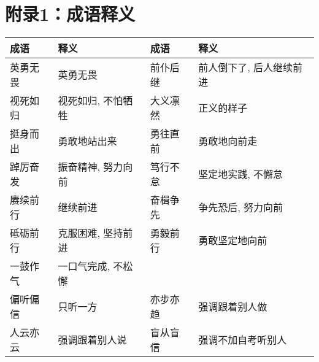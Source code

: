 \section{附录1：成语释义}


\begin{longtable}{|p{}|p{}|p{}|p{}|}
\hline
\textbf{成语} & \textbf{释义} & \textbf{成语} & \textbf{释义} \\
\hline
英勇无畏 & 英勇无畏 & 前仆后继 & 前人倒下了, 后人继续前进 \\
\hline
视死如归 & 视死如归, 不怕牺牲 & 大义凛然 & 正义的样子 \\
\hline
挺身而出 & 勇敢地站出来 & 勇往直前 & 勇敢地向前走 \\
\hline
踔厉奋发 & 振奋精神, 努力向前 & 笃行不怠 & 坚定地实践, 不懈怠 \\
\hline
赓续前行 & 继续前进 & 奋楫争先 & 争先恐后, 努力向前 \\
\hline
砥砺前行 & 克服困难, 坚持前进 & 勇毅前行 & 勇敢坚定地向前 \\
\hline
一鼓作气 & 一口气完成, 不松懈 & & \\
\hline
偏听偏信 & 只听一方 & 亦步亦趋 & 强调跟着别人做 \\
\hline
人云亦云 & 强调跟着别人说 & 盲从盲信 & 强调不加自考听别人 \\
\hline

\end{longtable}

